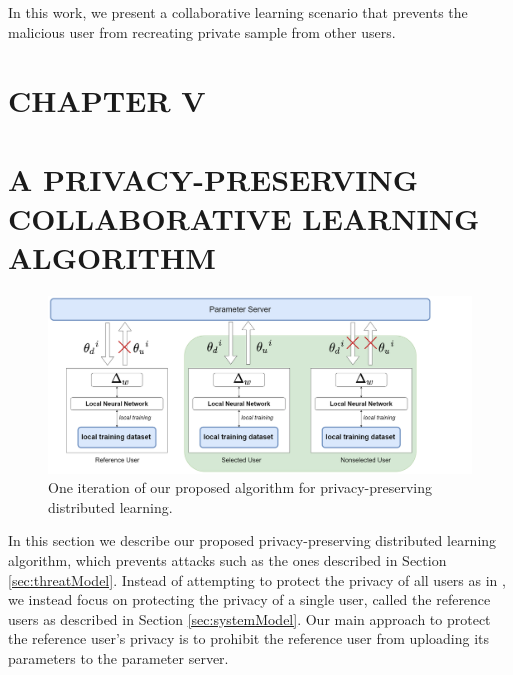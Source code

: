 \documentclass[letterpaper]{article}
\begin{document}
\begin{flushleft}
{%

In this work, we present a collaborative learning scenario that prevents the malicious user from recreating private sample
from other users. 

\pagebreak
\section*{CHAPTER V}
\vspace{0.25in}
\section{A PRIVACY-PRESERVING COLLABORATIVE LEARNING ALGORITHM}


\begin{figure}[H]
  \centering
    \includegraphics[width=7in]{OurHighLevelApproach.png}
    \caption[Privacy-preserving Distritbuted Learning.]{\label{fig:HighLevel} One iteration of our proposed algorithm for privacy-preserving distributed learning.}
  \end{figure}

In this section we describe our proposed privacy-preserving distributed learning algorithm, which prevents attacks
such as the ones described in Section \ref{sec:threatModel}. Instead of attempting to protect the privacy of all users as in 
\cite{shokri2015privacy}, we instead focus on protecting the privacy of a single user, called the reference users as described in
Section \ref{sec:systemModel}. Our main approach to protect the reference user's privacy is to prohibit the reference user
from uploading its parameters to the  parameter server. 

}
\end{flushleft}
\end{document}
